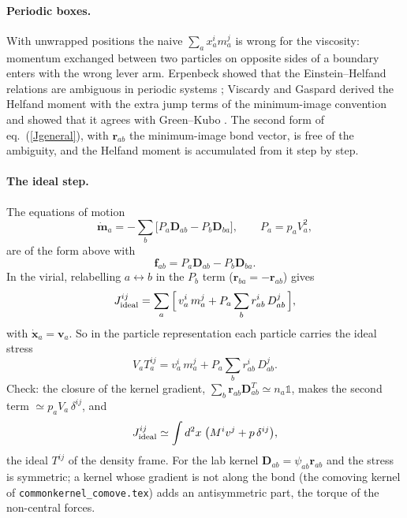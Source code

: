 \documentclass[11pt,aps,preprint,nofootinbib,superscriptaddress,tightenlines]{revtex4-2}
\def\st{\begin{equation}}
\def\stp{\end{equation}}
\def\Eq#1{eq.~(\ref{#1})}
\newcommand{\one}{\mathds{1}}
\let\oldparagraph\paragraph
\renewcommand{\paragraph}{\par\bigskip\oldparagraph}
\begin{document}
\paragraph{Periodic boxes.}  With unwrapped positions the naive $\sum_ax_a^im_a^j$ is wrong for the viscosity: momentum exchanged between two
particles on opposite sides of a boundary enters with the wrong lever arm.  Erpenbeck showed that the Einstein--Helfand relations
are ambiguous in periodic systems \cite{Erpenbeck}; Viscardy and Gaspard derived the Helfand moment with the extra jump terms of the
minimum-image convention and showed that it agrees with Green--Kubo \cite{ViscardyGaspard,ViscardyServantieGaspard}.  The second form of
\Eq{Jgeneral}, with $\bm r_{ab}$ the minimum-image bond vector, is free of the ambiguity, and the Helfand moment is accumulated from it step
by step.

\paragraph{The ideal step.}  The equations of motion
\st
\dot{\bm m}_a=-\sum_b\big[P_a\bm D_{ab}-P_b\bm D_{ba}\big],\qquad P_a=p_aV_a^2 ,
\stp
are of the form above with
\st
\bm f_{ab}=P_a\bm D_{ab}-P_b\bm D_{ba} .
\stp
In the virial, relabelling $a\leftrightarrow b$ in the $P_b$ term ($\bm r_{ba}=-\bm r_{ab}$) gives
\st
J^{ij}_{\rm ideal}=\sum_a\Big[\,v_a^i\,m_a^j+P_a\sum_br_{ab}^i\,D_{ab}^j\,\Big] ,
\label{Jideal}
\stp
with $\dot{\bm x}_a=\bm v_a$.  So in the particle representation each particle carries the ideal stress
\st
V_aT_a^{ij}=v_a^i\,m_a^j+P_a\sum_br_{ab}^i\,D_{ab}^j .
\label{Tparticle}
\stp
Check: the closure of the kernel gradient, $\sum_b\bm r_{ab}\bm D_{ab}^T\simeq n_a\one$, makes the second term $\simeq p_aV_a\,\delta^{ij}$, and
\st
J^{ij}_{\rm ideal}\simeq\int d^2x\;\big(M^iv^j+p\,\delta^{ij}\big),
\stp
the ideal $T^{ij}$ of the density frame.  For the lab kernel $\bm D_{ab}=\psi_{ab}\bm r_{ab}$ and the stress is symmetric; a kernel whose gradient
is not along the bond (the comoving kernel of \texttt{commonkernel\_comove.tex}) adds an antisymmetric part, the torque of the
non-central forces.
\end{document}
